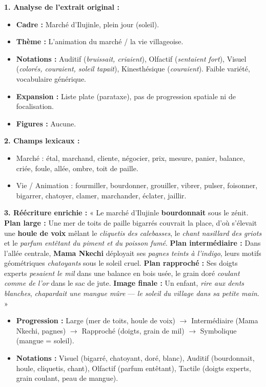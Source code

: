 \documentclass[11pt]{article}
\begin{document}
\begin{corrige}[Exercice n°1]
\textbf{1. Analyse de l'extrait original :}
\begin{itemize}
    \item \textbf{Cadre :} Marché d'Ilujinle, plein jour (soleil).
    \item \textbf{Thème :} L'animation du marché / la vie villageoise.
    \item \textbf{Notations :} Auditif (\emph{bruissait, criaient}), Olfactif (\emph{sentaient fort}), Visuel (\emph{colorés, couraient, soleil tapait}), Kinesthésique (\emph{couraient}). Faible variété, vocabulaire générique.
    \item \textbf{Expansion :} Liste plate (parataxe), pas de progression spatiale ni de focalisation.
    \item \textbf{Figures :} Aucune.
\end{itemize}
\textbf{2. Champs lexicaux :}
\begin{itemize}
    \item Marché : étal, marchand, cliente, négocier, prix, mesure, panier, balance, criée, foule, allée, ombre, toit de paille.
    \item Vie / Animation : fourmiller, bourdonner, grouiller, vibrer, pulser, foisonner, bigarrer, chatoyer, clamer, marchander, éclater, jaillir.
\end{itemize}
\textbf{3. Réécriture enrichie :}
« Le marché d'Ilujinle \textbf{bourdonnait} sous le zénit. \textbf{Plan large :} Une mer de toits de paille bigarrés couvrait la place, d'où s'élevait une \textbf{houle de voix} mêlant le \emph{cliquetis des calebasses}, le \emph{chant nasillard des griots} et le \emph{parfum entêtant du piment et du poisson fumé}. \textbf{Plan intermédiaire :} Dans l'allée centrale, \textbf{Mama Nkechi} déployait ses \emph{pagnes teints à l'indigo}, leurs motifs géométriques \emph{chatoyants} sous le soleil cruel. \textbf{Plan rapproché :} Ses doigts experts \emph{pesaient le mil} dans une balance en bois usée, le grain doré \emph{coulant comme de l'or} dans le sac de jute. \textbf{Image finale :} Un enfant, \emph{rire aux dents blanches}, \emph{chapardait une mangue mûre} — \emph{le soleil du village dans sa petite main}. »
\begin{itemize}
    \item \textbf{Progression :} Large (mer de toits, houle de voix) $\rightarrow$ Intermédiaire (Mama Nkechi, pagnes) $\rightarrow$ Rapproché (doigts, grain de mil) $\rightarrow$ Symbolique (mangue = soleil).
    \item \textbf{Notations :} Visuel (bigarré, chatoyant, doré, blanc), Auditif (bourdonnait, houle, cliquetis, chant), Olfactif (parfum entêtant), Tactile (doigts experts, grain coulant, peau de mangue).

\end{itemize}
\end{corrige}
\end{document}
